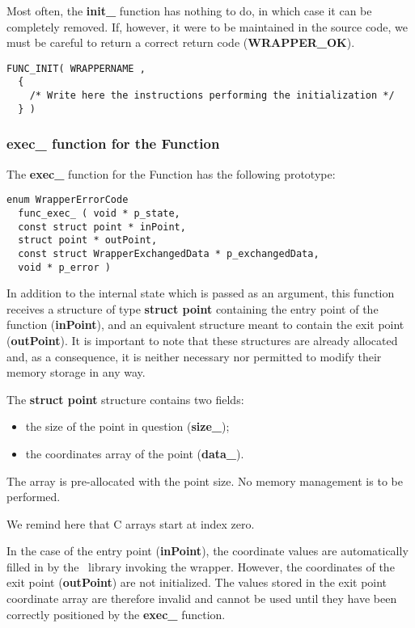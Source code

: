 Most often, the {\bf init\_} function has nothing to do, in which case it can be completely removed. If, however, it were to be maintained in the source code, we must be careful to return a correct return code ({\bf WRAPPER\_OK}).

\lstset{language=C++, basicstyle=\normalsize}
\begin{lstlisting}[frame=TBRL]
  FUNC_INIT( WRAPPERNAME ,
  {
    /* Write here the instructions performing the initialization */
  } )
\end{lstlisting}

\subsubsection{exec\_ function for the Function}

The {\bf exec\_} function for the Function has the following prototype:

\lstset{language=C++, basicstyle=\normalsize}
\begin{lstlisting}[frame=TBRL]
  enum WrapperErrorCode
  func_exec_ ( void * p_state,
  const struct point * inPoint,
  struct point * outPoint,
  const struct WrapperExchangedData * p_exchangedData,
  void * p_error )
\end{lstlisting}

In addition to the internal state which is passed as an argument, this function receives a structure of type {\bf struct point} containing the entry point of the function ({\bf inPoint}), and an equivalent structure meant to contain the exit point ({\bf outPoint}). It is important to note that these structures are already allocated and, as a consequence, it is neither necessary nor permitted to modify their memory storage in any way.

The {\bf struct point} structure contains two fields:
\begin{itemize}
\item the size of the point in question ({\bf size\_});
\item the coordinates array of the point ({\bf data\_}).
\end{itemize}

The array is pre-allocated with the point size. No memory management is to be performed.

We remind here that C arrays start at index zero.

In the case of the entry point ({\bf inPoint}), the coordinate values are automatically filled in by the \OT\ library invoking the wrapper. However, the coordinates of the exit point ({\bf outPoint}) are not initialized. The values stored in the exit point coordinate array are therefore invalid and cannot be used until they have been correctly positioned by the {\bf exec\_} function.

